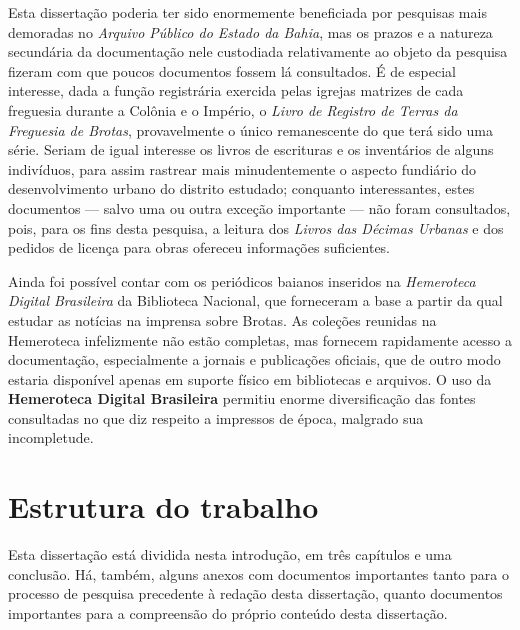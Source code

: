 Esta dissertação poderia ter sido enormemente beneficiada por pesquisas mais demoradas no \textit{Arquivo Público do Estado da Bahia}, mas os prazos e a natureza secundária da documentação nele custodiada relativamente ao objeto da pesquisa fizeram com que poucos documentos fossem lá consultados. É de especial interesse, dada a função registrária exercida pelas igrejas matrizes de cada freguesia durante a Colônia e o Império, o \textit{Livro de Registro de Terras da Freguesia de Brotas}, provavelmente o único remanescente do que terá sido uma série. Seriam de igual interesse os livros de escrituras e os inventários de alguns indivíduos, para assim rastrear mais minudentemente o aspecto fundiário do desenvolvimento urbano do distrito estudado; conquanto interessantes, estes documentos --- salvo uma ou outra exceção importante --- não foram consultados, pois, para os fins desta pesquisa, a leitura dos \textit{Livros das Décimas Urbanas} e dos pedidos de licença para obras ofereceu informações suficientes.

Ainda foi possível contar com os periódicos baianos inseridos na \textit{Hemeroteca Digital Brasileira} da Biblioteca Nacional, que forneceram a base a partir da qual estudar as notícias na imprensa sobre Brotas. As coleções reunidas na Hemeroteca infelizmente não estão completas, mas fornecem rapidamente acesso a documentação, especialmente a jornais e publicações oficiais, que de outro modo estaria disponível apenas em suporte físico em bibliotecas e arquivos. O uso da \textbf{Hemeroteca Digital Brasileira} permitiu enorme diversificação das fontes consultadas no que diz respeito a impressos de época, malgrado sua incompletude.

\section[Estrutura do trabalho]{Estrutura do trabalho}\label{sec:estrutrab}

Esta dissertação está dividida nesta introdução, em três capítulos e uma conclusão. Há, também, 
alguns anexos com documentos importantes tanto para o processo de pesquisa precedente à redação desta dissertação, quanto documentos importantes para a compreensão do próprio conteúdo desta dissertação.

